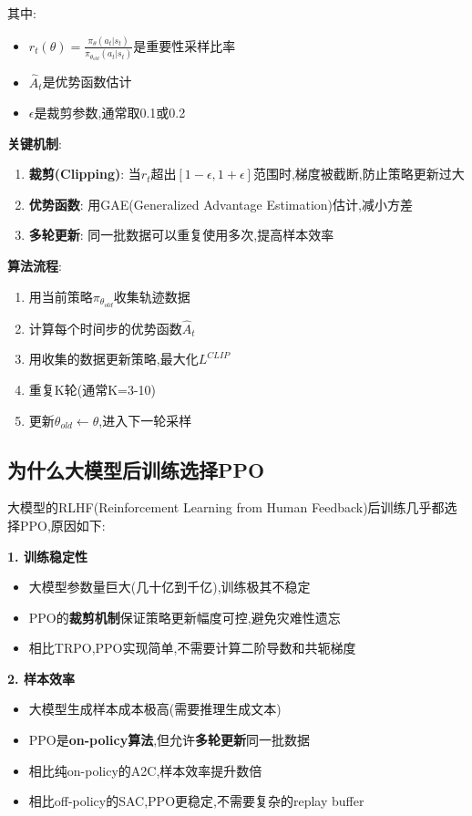 \documentclass[UTF8]{ctexart}
\begin{document}
其中:
\begin{itemize}
    \item $r_t(\theta) = \frac{\pi_\theta(a_t|s_t)}{\pi_{\theta_{old}}(a_t|s_t)}$是重要性采样比率
    \item $\hat{A}_t$是优势函数估计
    \item $\epsilon$是裁剪参数,通常取0.1或0.2
\end{itemize}

\textbf{关键机制}:
\begin{enumerate}
    \item \textbf{裁剪(Clipping)}: 当$r_t$超出$[1-\epsilon, 1+\epsilon]$范围时,梯度被截断,防止策略更新过大
    \item \textbf{优势函数}: 用GAE(Generalized Advantage Estimation)估计,减小方差
    \item \textbf{多轮更新}: 同一批数据可以重复使用多次,提高样本效率
\end{enumerate}

\textbf{算法流程}:
\begin{enumerate}
    \item 用当前策略$\pi_{\theta_{old}}$收集轨迹数据
    \item 计算每个时间步的优势函数$\hat{A}_t$
    \item 用收集的数据更新策略,最大化$L^{CLIP}$
    \item 重复K轮(通常K=3-10)
    \item 更新$\theta_{old} \leftarrow \theta$,进入下一轮采样
\end{enumerate}

\subsection{为什么大模型后训练选择PPO}

大模型的RLHF(Reinforcement Learning from Human Feedback)后训练几乎都选择PPO,原因如下:

\textbf{1. 训练稳定性}
\begin{itemize}
    \item 大模型参数量巨大(几十亿到千亿),训练极其不稳定
    \item PPO的\textbf{裁剪机制}保证策略更新幅度可控,避免灾难性遗忘
    \item 相比TRPO,PPO实现简单,不需要计算二阶导数和共轭梯度
\end{itemize}

\textbf{2. 样本效率}
\begin{itemize}
    \item 大模型生成样本成本极高(需要推理生成文本)
    \item PPO是\textbf{on-policy算法},但允许\textbf{多轮更新}同一批数据
    \item 相比纯on-policy的A2C,样本效率提升数倍
    \item 相比off-policy的SAC,PPO更稳定,不需要复杂的replay buffer
\end{itemize}
\end{document}
